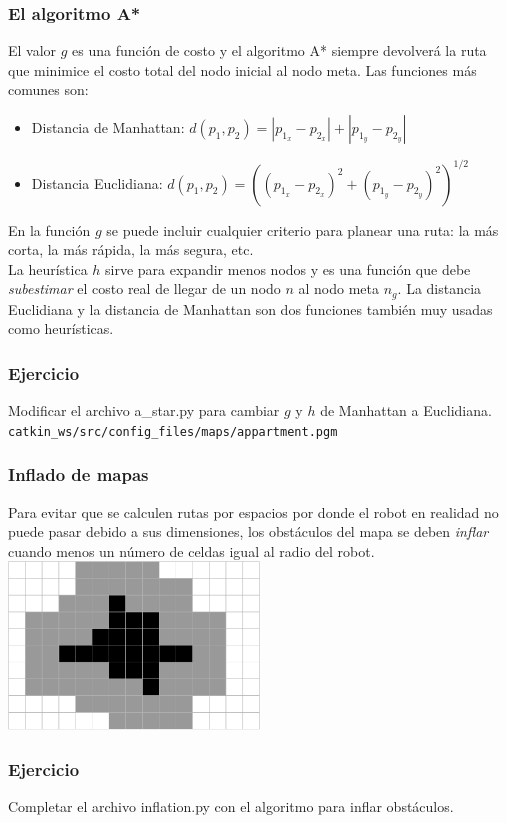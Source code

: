 \begin{frame}\frametitle{El algoritmo A*}
  El valor $g$ es una función de costo y el algoritmo A* siempre devolverá la ruta que minimice el costo total del nodo inicial al nodo meta. Las funciones más comunes son:
  \begin{itemize}
  \item Distancia de Manhattan: $d(p_1, p_2) = |p_{1_x} - p_{2_x}| + |p_{1_y} - p_{2_y}|$
  \item Distancia Euclidiana: $d(p_1, p_2) = \left( (p_{1_x} - p_{2_x})^2 + (p_{1_y} - p_{2_y})^2 \right)^{1/2}$
  \end{itemize}
  En la función $g$ se puede incluir cualquier criterio para planear una ruta: la más corta, la más rápida, la más segura, etc.\\
  La heurística $h$ sirve para expandir menos nodos y es una función que debe \textit{subestimar} el costo real de llegar de un nodo $n$ al nodo meta $n_g$. La distancia Euclidiana y la distancia de Manhattan son dos funciones también muy usadas como heurísticas. 
\end{frame}

\begin{frame}[containsverbatim]\frametitle{Ejercicio}
  Modificar el archivo a\_star.py para cambiar $g$ y $h$ de Manhattan a Euclidiana.
  \texttt{catkin\_ws/src/config\_files/maps/appartment.pgm}
    
\end{frame}


\begin{frame}\frametitle{Inflado de mapas}
  Para evitar que se calculen rutas por espacios por donde el robot en realidad no puede pasar debido a sus dimensiones, los obstáculos del mapa se deben \textit{inflar} cuando menos un número de celdas igual al radio del robot.\\
  \includegraphics[width=0.5\textwidth]{Figures/Inflation.pdf}
\end{frame}

\begin{frame}[containsverbatim]\frametitle{Ejercicio}
  Completar el archivo inflation.py con el algoritmo para inflar obstáculos.
    
\end{frame}

